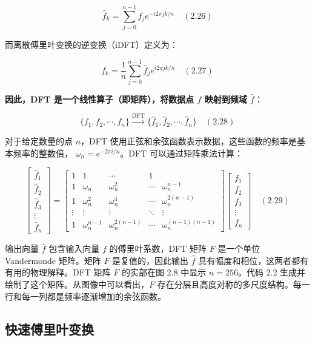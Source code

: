 \documentclass{ctexart}
\begin{document}
\[
\hat{f}_k = \sum_{j=0}^{n-1} f_j e^{-i2\pi jk/n} \quad (2.26)
\]

而离散傅里叶变换的逆变换（iDFT）定义为：

\[
f_k = \frac{1}{n} \sum_{j=0}^{n-1} \hat{f}_j e^{i2\pi jk/n} \quad (2.27)
\]

\textbf{\color{red}因此，DFT 是一个线性算子（即矩阵），将数据点 \( f \) 映射到频域 \( \hat{f} \)}：

\[
\{f_1, f_2, \cdots, f_n\} \xrightarrow{\text{DFT}} \{ \hat{f}_1, \hat{f}_2, \cdots, \hat{f}_n \} \quad (2.28)
\]

对于给定数量的点 \( n \)，DFT 使用正弦和余弦函数表示数据，这些函数的频率是基本频率的整数倍， \( \omega_n = e^{-2\pi i/n} \)。DFT 可以通过矩阵乘法计算：

\[
\begin{bmatrix}
\hat{f}_1 \\
\hat{f}_2 \\
\hat{f}_3 \\
\vdots \\
\hat{f}_n
\end{bmatrix}
=
\begin{bmatrix}
1 & 1 & \cdots & 1 \\
1 & \omega_n & \omega_n^2 & \cdots & \omega_n^{n-1} \\
1 & \omega_n^2 & \omega_n^4 & \cdots & \omega_n^{2(n-1)} \\
\vdots & \vdots & \vdots & \ddots & \vdots \\
1 & \omega_n^{n-1} & \omega_n^{2(n-1)} & \cdots & \omega_n^{(n-1)(n-1)}
\end{bmatrix}
\begin{bmatrix}
f_1 \\
f_2 \\
f_3 \\
\vdots \\
f_n
\end{bmatrix}
\quad (2.29)
\]

输出向量 \( \hat{f} \) 包含输入向量 \( f \) 的傅里叶系数，DFT 矩阵 \( F \) 是一个单位 Vandermonde 矩阵。矩阵 \( F \) 是复值的，因此输出 \( \hat{f} \) 具有幅度和相位，这两者都有有用的物理解释。DFT 矩阵 \( F \) 的实部在图 2.8 中显示 \( n = 256 \)。代码 2.2 生成并绘制了这个矩阵。从图像中可以看出，\( F \) 存在分层且高度对称的多尺度结构。每一行和每一列都是频率逐渐增加的余弦函数。

\subsection{快速傅里叶变换}
\end{document}
